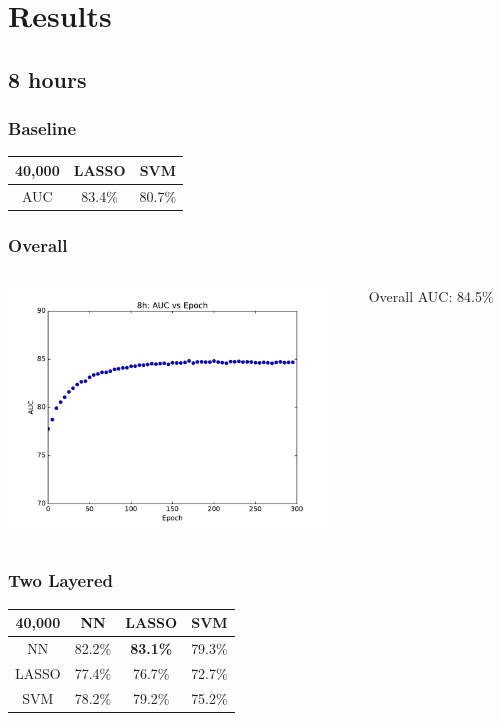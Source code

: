 \documentclass[table]{beamer}
\begin{document}
\section{Results}


\subsection{8 hours}

\begin{frame}
	\frametitle{Baseline}
	\begin{center}
		\begin{tabular}{c | c c}
			40,000 & LASSO & SVM \\ \hline
			AUC & 83.4\% & 80.7\% \\
		\end{tabular}
	\end{center}
\end{frame}

\begin{frame}
\frametitle{Overall}
\begin{columns}[c]
	\begin{column}{8cm}
		\includegraphics[width=8.5cm]{Images/NNplots/8h.pdf}
	\end{column}
\begin{column}{4cm}
Overall AUC: 84.5\%
\end{column}

\end{columns}
\end{frame}

\begin{frame}
	\frametitle{Two Layered}
	\begin{center}
		\begin{tabular}{c | c c c}
			40,000 & NN & LASSO & SVM \\ \hline
			NN & 82.2\% & \textbf{83.1\%} & 79.3\% \\
			LASSO & 77.4\% & 76.7\% & 72.7\% \\
			SVM & 78.2\% & 79.2\% & 75.2\%
		\end{tabular}
	
	\end{center}
\end{frame}
\end{document}
